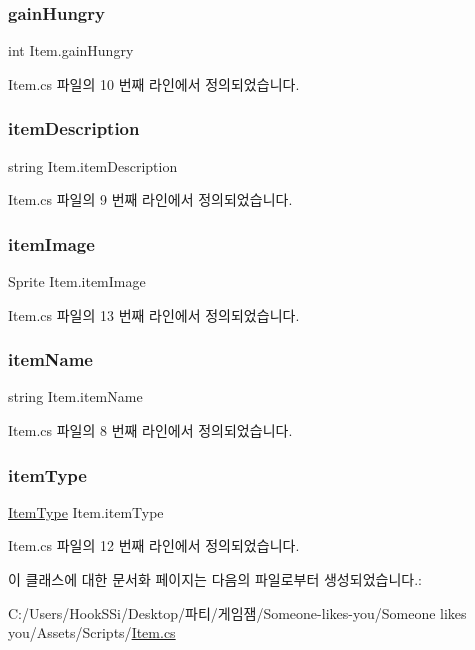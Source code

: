 \subsubsection{\texorpdfstring{gainHungry}{gainHungry}}
{\footnotesize\ttfamily int Item.\+gain\+Hungry}



Item.\+cs 파일의 10 번째 라인에서 정의되었습니다.

\mbox{\label{class_item_a1e47deb8739893cbfa26460cf4be4f00}} 
\subsubsection{\texorpdfstring{itemDescription}{itemDescription}}
{\footnotesize\ttfamily string Item.\+item\+Description}



Item.\+cs 파일의 9 번째 라인에서 정의되었습니다.

\mbox{\label{class_item_aa189431b0e859890a3b9118da64cc484}} 
\subsubsection{\texorpdfstring{itemImage}{itemImage}}
{\footnotesize\ttfamily Sprite Item.\+item\+Image}



Item.\+cs 파일의 13 번째 라인에서 정의되었습니다.

\mbox{\label{class_item_a8c54f77a262b1ffd78c1cd8cbed86ae0}} 
\subsubsection{\texorpdfstring{itemName}{itemName}}
{\footnotesize\ttfamily string Item.\+item\+Name}



Item.\+cs 파일의 8 번째 라인에서 정의되었습니다.

\mbox{\label{class_item_adbecc774c576b08f57f32655acf7363d}} 
\subsubsection{\texorpdfstring{itemType}{itemType}}
{\footnotesize\ttfamily \mbox{\hyperlink{class_item_ab5eeb575e9d66ebcfef9b58b667fad05}{Item\+Type}} Item.\+item\+Type}



Item.\+cs 파일의 12 번째 라인에서 정의되었습니다.



이 클래스에 대한 문서화 페이지는 다음의 파일로부터 생성되었습니다.\+:\begin{DoxyCompactItemize}
\item 
C\+:/\+Users/\+Hook\+S\+Si/\+Desktop/파티/게임잼/\+Someone-\/likes-\/you/\+Someone likes you/\+Assets/\+Scripts/\mbox{\hyperlink{_item_8cs}{Item.\+cs}}\end{DoxyCompactItemize}
